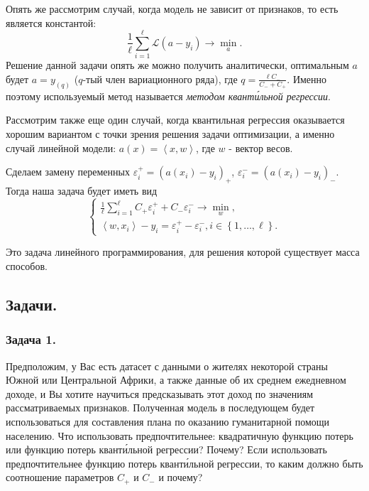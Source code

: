 Опять же рассмотрим случай, когда модель не зависит от признаков, то есть является константой:
$$\frac{1}{\ell}\sum\limits_{i=1}^\ell\mathscr{L}\left(a - y_i\right) \longrightarrow \min\limits_{a}.$$
Решение данной задачи опять же можно получить аналитически, оптимальным $a$ будет $a = y_{(q)}$ ($q$-тый член вариационного ряда), где $q = \frac{\ell C_-}{C_- + C_+}$.
Именно поэтому используемый метод называется \textit{методом квант\'{и}льной регрессии}.

Рассмотрим также еще один случай, когда квантильная регрессия оказывается хорошим вариантом с точки зрения решения задачи оптимизации, а именно случай линейной модели: $a(x) = \left\langle x, w \right\rangle$, где $w$ - вектор весов.

Сделаем замену переменных $\varepsilon_i^+ = (a(x_i) - y_i)_+$, $\varepsilon_i^- = (a(x_i) - y_i)_-$. Тогда наша задача будет иметь вид
$$\begin{cases}
    \frac{1}{\ell}\sum_{i=1}^\ell C_+\varepsilon_i^+ + C_-\varepsilon_i^- \longrightarrow \min\limits_{w},\\
    \left\langle w, x_i \right\rangle - y_i = \varepsilon_i^+ - \varepsilon_i^-, i \in \left\{ 1 , \dotsc, \ell \right\}.
\end{cases}$$

Это задача линейного программирования, для решения которой существует масса способов.

\newpage

\subsection*{Задачи.}

\subsubsection*{Задача 1.}

Предположим, у Вас есть датасет с данными о жителях некоторой страны Южной или Центральной Африки, а также данные об их среднем ежедневном доходе, и Вы хотите научиться предсказывать этот доход по значениям рассматриваемых признаков. Полученная модель в последующем будет использоваться для составления плана по оказанию гуманитарной помощи населению. Что использовать предпочтительнее: квадратичную функцию потерь или функцию потерь квант\'{и}льной регрессии? Почему? Если использовать предпочтительнее функцию потерь квант\'{и}льной регрессии, то каким должно быть соотношение параметров $C_+$ и $C_-$ и почему?

